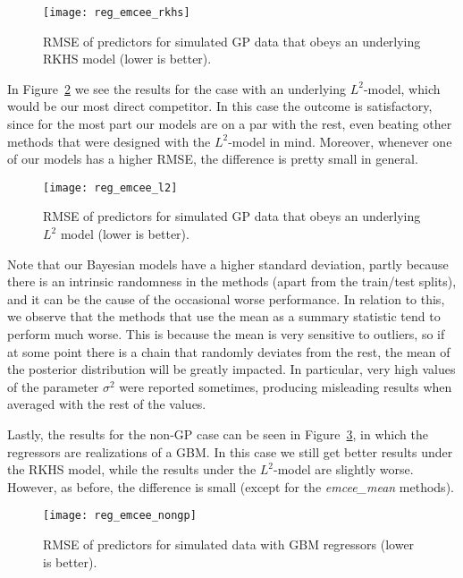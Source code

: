 \begin{figure}[ht!]
  \centering
  \texttt{[image: reg\_emcee\_rkhs]}
  \caption{RMSE of predictors for simulated GP data that obeys an underlying RKHS model (lower is better).}\label{fig:reg_emcee_rkhs}
\end{figure}

In Figure~\ref{fig:reg_emcee_l2} we see the results for the case with an underlying \(L^2\)-model, which would be our most direct competitor. In this case the outcome is satisfactory, since for the most part our models are on a par with the rest, even beating other methods that were designed with the \(L^2\)-model in mind. Moreover, whenever one of our models has a higher RMSE, the difference is pretty small in general.
\begin{figure}[ht!]
  \centering
  \texttt{[image: reg\_emcee\_l2]}
  \caption{RMSE of predictors for simulated GP data that obeys an underlying \(L^2\) model (lower is better).}\label{fig:reg_emcee_l2}
\end{figure}

Note that our Bayesian models have a higher standard deviation, partly because there is an intrinsic randomness in the methods (apart from the train/test splits), and it can be the cause of the occasional worse performance. In relation to this, we observe that the methods that use the mean as a summary statistic tend to perform much worse. This is because the mean is very sensitive to outliers, so if at some point there is a chain that randomly deviates from the rest, the mean of the posterior distribution will be greatly impacted. In particular, very high values of the parameter \(\sigma^2\) were reported sometimes, producing misleading results when averaged with the rest of the values.

Lastly, the results for the non-GP case can be seen in Figure~\ref{fig:reg_emcee_nongp}, in which the regressors are realizations of a GBM. In this case we still get better results under the RKHS model, while the results under the \(L^2\)-model are slightly worse. However, as before, the difference is small (except for the \textit{emcee\_mean} methods).

\begin{figure}[ht!]
  \centering
  \texttt{[image: reg\_emcee\_nongp]}
  \caption{RMSE of predictors for simulated data with GBM regressors (lower is better).}\label{fig:reg_emcee_nongp}
\end{figure}

